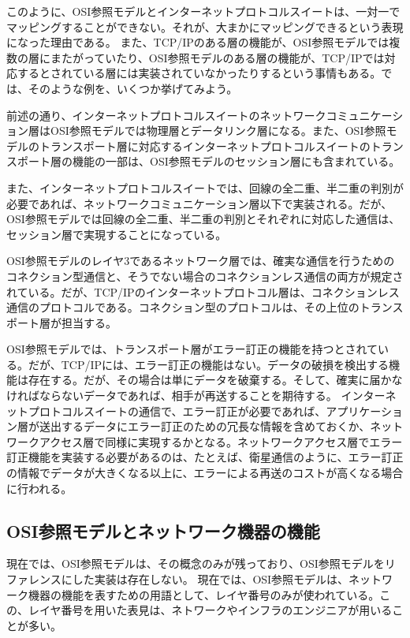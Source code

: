 このように、OSI参照モデルとインターネットプロトコルスイートは、一対一でマッピングすることができない。それが、大まかにマッピングできるという表現になった理由である。
また、TCP/IPのある層の機能が、OSI参照モデルでは複数の層にまたがっていたり、OSI参照モデルのある層の機能が、TCP/IPでは対応するとされている層には実装されていなかったりするという事情もある。では、そのような例を、いくつか挙げてみよう。

前述の通り、インターネットプロトコルスイートのネットワークコミュニケーション層はOSI参照モデルでは物理層とデータリンク層になる。また、OSI参照モデルのトランスポート層に対応するインターネットプロトコルスイートのトランスポート層の機能の一部は、OSI参照モデルのセッション層にも含まれている。

また、インターネットプロトコルスイートでは、回線の全二重、半二重の判別が必要であれば、ネットワークコミュニケーション層以下で実装される。だが、OSI参照モデルでは回線の全二重、半二重の判別とそれぞれに対応した通信は、セッション層で実現することになっている。

OSI参照モデルのレイヤ3であるネットワーク層では、確実な通信を行うためのコネクション型通信と、そうでない場合のコネクションレス通信の両方が規定されている。だが、TCP/IPのインターネットプロトコル層は、コネクションレス通信のプロトコルである。コネクション型のプロトコルは、その上位のトランスポート層が担当する。

OSI参照モデルでは、トランスポート層がエラー訂正の機能を持つとされている。だが、TCP/IPには、エラー訂正の機能はない。データの破損を検出する機能は存在する。だが、その場合は単にデータを破棄する。そして、確実に届かなければならないデータであれば、相手が再送することを期待する。
インターネットプロトコルスイートの通信で、エラー訂正が必要であれば、アプリケーション層が送出するデータにエラー訂正のための冗長な情報を含めておくか、ネットワークアクセス層で同様に実現するかとなる。ネットワークアクセス層でエラー訂正機能を実装する必要があるのは、たとえば、衛星通信のように、エラー訂正の情報でデータが大きくなる以上に、エラーによる再送のコストが高くなる場合に行われる。


\subsection{OSI参照モデルとネットワーク機器の機能}
現在では、OSI参照モデルは、その概念のみが残っており、OSI参照モデルをリファレンスにした実装は存在しない。
現在では、OSI参照モデルは、ネットワーク機器の機能を表すための用語として、レイヤ番号のみが使われている。この、レイヤ番号を用いた表見は、ネトワークやインフラのエンジニアが用いることが多い。

